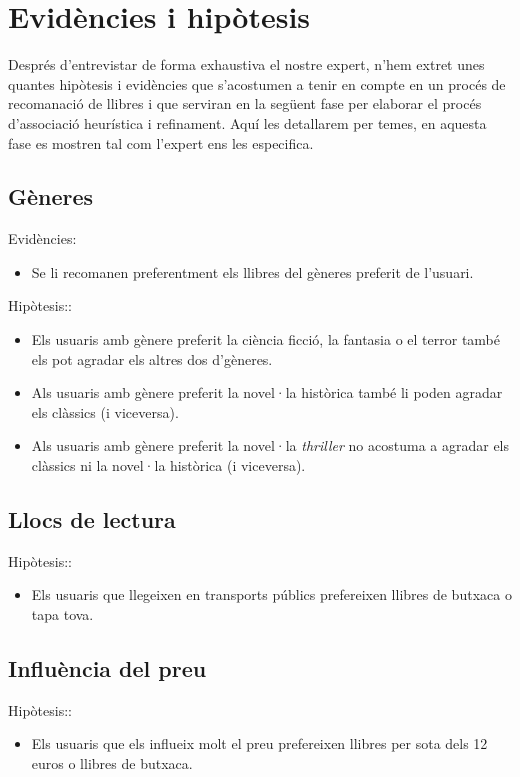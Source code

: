 \section{Evidències i hipòtesis}

Després d'entrevistar de forma exhaustiva el nostre expert, n'hem extret unes quantes hipòtesis i evidències que s'acostumen a tenir en compte en un procés de recomanació de llibres i que serviran en la següent fase per elaborar el procés d'associació heurística i refinament. Aquí les detallarem per temes, en aquesta fase es mostren tal com l'expert ens les especifica.

\subsection{Gèneres}
Evidències:
\begin{itemize}
  \item Se li recomanen preferentment els llibres del gèneres preferit de l'usuari.
\end{itemize}
Hipòtesis::
\begin{itemize}
  \item Els usuaris amb gènere preferit la ciència ficció, la fantasia o el terror també els pot agradar els altres dos d'gèneres.
  \item Als usuaris amb gènere preferit la novel·la històrica també li poden agradar els clàssics (i viceversa).
  \item Als usuaris amb gènere preferit la novel·la \emph{thriller} no acostuma a agradar els clàssics ni la novel·la històrica (i viceversa).
\end{itemize}

\subsection{Llocs de lectura}
Hipòtesis::
\begin{itemize}
  \item Els usuaris que llegeixen en transports públics prefereixen llibres de butxaca o tapa tova.
\end{itemize}

\subsection{Influència del preu}
Hipòtesis::
\begin{itemize}
  \item Els usuaris que els influeix molt el preu prefereixen llibres per sota dels 12 euros o llibres de butxaca.
\end{itemize}

